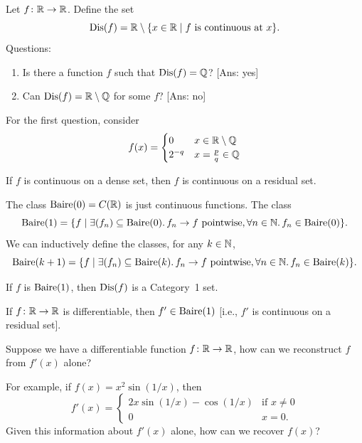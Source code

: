 \begin{example}
Let $f\colon\mathbb{R}\to\mathbb{R}$. Define the set
\begin{equation}
\operatorname{Dis}(f)=\mathbb{R}\setminus\{x\in\mathbb{R}\mid\mbox{$f$ is continuous at $x$}\}.
\end{equation}
Questions:
\begin{enumerate}
\item Is there a function $f$ such that $\operatorname{Dis}(f)=\mathbb{Q}$? [Ans: yes]
\item Can $\operatorname{Dis}(f)=\mathbb{R}\setminus\mathbb{Q}$ for some $f$? [Ans: no]
\end{enumerate}
For the first question, consider
\begin{equation}
f(x)=\begin{cases}0 & x\in\mathbb{R}\setminus\mathbb{Q}\\
2^{-q} & x=\frac{p}{q}\in\mathbb{Q}
\end{cases}
\end{equation}
\end{example}

\begin{theorem}
If $f$ is continuous on a dense set, then $f$ is continuous on a
residual set.
\end{theorem}

\begin{example}
The class $\operatorname{Baire}(0)=C(\mathbb{R})$ is just continuous functions. The class
\begin{equation}
\operatorname{Baire}(1)=\{f\mid\exists(f_{n})\subseteq\operatorname{Baire}(0)\ldotp f_{n}\to f\mbox{ pointwise},
\forall n\in\mathbb{N}\ldotp f_{n}\in\operatorname{Baire}(0)\}.
\end{equation}
We can inductively define the classes, for any $k\in\mathbb{N}$,
\begin{equation}
\operatorname{Baire}(k+1)=\{f\mid\exists(f_{n})\subseteq\operatorname{Baire}(k)\ldotp f_{n}\to f\mbox{ pointwise},
\forall n\in\mathbb{N}\ldotp f_{n}\in\operatorname{Baire}(k)\}.
\end{equation}
\end{example}

\begin{theorem}
If $f$ is $\operatorname{Baire}(1)$, then $\operatorname{Dis}(f)$ is a Category~1 set.
\end{theorem}

\begin{lemma}
If $f\colon\mathbb{R}\to\mathbb{R}$ is differentiable, then $f'\in\operatorname{Baire}(1)$ [i.e.,
  $f'$ is continuous on a residual set].
\end{lemma}

\begin{question}
Suppose we have a differentiable function $f\colon\mathbb{R}\to\mathbb{R}$, how can
we reconstruct $f$ from $f'(x)$ alone?

For example, if $f(x)=x^{2}\sin(1/x)$, then
\begin{equation}
f'(x)=\begin{cases}2x\sin(1/x)-\cos(1/x) & \mbox{if }x\neq0\\
0 & x=0.
\end{cases}
\end{equation}
Given this information about $f'(x)$ alone, how can we recover $f(x)$?
\end{question}